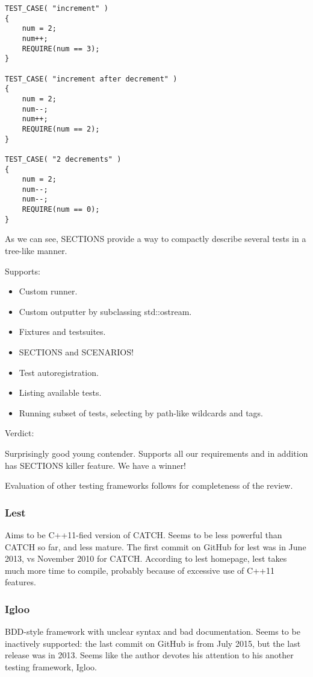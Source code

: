 \documentclass[10pt, a5paper]{article}
\begin{document}
\begin{verbatim}
TEST_CASE( "increment" )
{
    num = 2;
    num++;
    REQUIRE(num == 3);
}

TEST_CASE( "increment after decrement" )
{
    num = 2;
    num--;
    num++;
    REQUIRE(num == 2);
}

TEST_CASE( "2 decrements" )
{
    num = 2;
    num--;
    num--;
    REQUIRE(num == 0);
}
\end{verbatim}
As we can see, SECTIONS provide a way to compactly describe several tests in a tree-like manner.

Supports:

\begin{itemize}
  \item Custom runner.
  \item Custom outputter by subclassing std::ostream.
  \item Fixtures and testsuites.
  \item SECTIONS and SCENARIOS!
  \item Test autoregistration.
  \item Listing available tests.
  \item Running subset of tests, selecting by path-like wildcards and tags.
\end{itemize}

Verdict:

Surprisingly good young contender. Supports all our requirements and in addition has SECTIONS killer feature. We have a winner!

Evaluation of other testing frameworks follows for completeness of the review.

\subsubsection*{Lest}

Aims to be C++11-fied version of CATCH. Seems to be less powerful than CATCH so far, and less mature. The first commit on GitHub for lest was in June 2013, vs November 2010 for CATCH. According to lest homepage, lest takes much more time to compile, probably because of excessive use of C++11 features.

\subsubsection*{Igloo}

BDD-style framework with unclear syntax and bad documentation. Seems to be inactively supported: the last commit on GitHub is from July 2015, but the last release was in 2013. Seems like the author devotes his attention to his another testing framework, Igloo.
\end{document}
